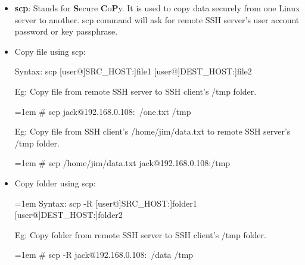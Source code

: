 \setlength{\columnsep}{3pt}
\begin{flushleft}

\bigskip
\begin{itemize}
	\item \textbf{scp}: Stands for \textbf{S}ecure \textbf{C}o\textbf{P}y. It is used to copy data securely from one Linux server to another.
	\newline
	scp command will ask for remote SSH server's user account password or key passphrase.
	\bigskip
		
	\item Copy file using scp:
	\begin{tcolorbox}[breakable,notitle,boxrule=0pt,colback=pink,colframe=pink]
		\color{black}

		Syntax: scp [user@]SRC\_HOST:]file1 [user@]DEST\_HOST:]file2

	\end{tcolorbox}
	
	\bigskip
	
	Eg: Copy file from remote SSH server to SSH client's /tmp folder.
	\begin{tcolorbox}[breakable,notitle,boxrule=-0pt,colback=black,colframe=black]
		\color{green}
		\font=1em
		\# scp jack@192.168.0.108:~/one.txt  /tmp
		\font=4pt
	\end{tcolorbox}

	\bigskip
	
	Eg: Copy file from SSH client's /home/jim/data.txt to remote SSH server's /tmp folder.
	\begin{tcolorbox}[breakable,notitle,boxrule=-0pt,colback=black,colframe=black]
		\color{green}
		\font=1em
		\# scp  /home/jim/data.txt  jack@192.168.0.108:/tmp
		\font=4pt
	\end{tcolorbox}

	\bigskip
	
	\item Copy folder using scp:
	\begin{tcolorbox}[breakable,notitle,boxrule=0pt,colback=pink,colframe=pink]
		\color{black}
		\font=1em
		Syntax: scp -R [user@]SRC\_HOST:]folder1 [user@]DEST\_HOST:]folder2
		\font=4pt
	\end{tcolorbox}

	\bigskip

	Eg: Copy folder from remote SSH server to SSH client's /tmp folder.
	\begin{tcolorbox}[breakable,notitle,boxrule=-0pt,colback=black,colframe=black]
		\color{green}
		\font=1em
		\# scp -R jack@192.168.0.108:~/data  /tmp
		\font=4pt
	\end{tcolorbox}
	

\end{itemize}
\end{flushleft}
